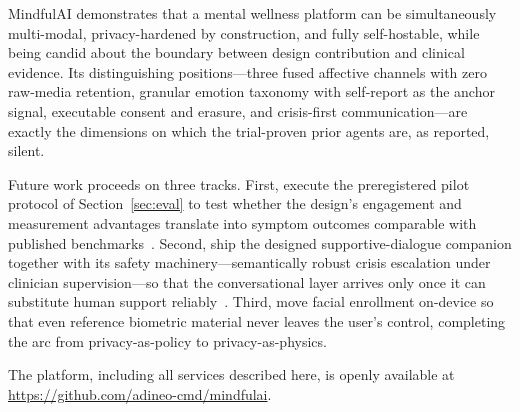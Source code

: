 \documentclass[11pt,a4paper]{article}
\newcommand{\system}{MindfulAI}
\begin{document}
\system{} demonstrates that a mental wellness platform can be simultaneously multi-modal, privacy-hardened by construction, and fully self-hostable, while being candid about the boundary between design contribution and clinical evidence. Its distinguishing positions---three fused affective channels with zero raw-media retention, granular emotion taxonomy with self-report as the anchor signal, executable consent and erasure, and crisis-first communication---are exactly the dimensions on which the trial-proven prior agents are, as reported, silent.

Future work proceeds on three tracks. First, execute the preregistered pilot protocol of Section~\ref{sec:eval} to test whether the design's engagement and measurement advantages translate into symptom outcomes comparable with published benchmarks~\cite{linardon2019,fitzpatrick2017}. Second, ship the designed supportive-dialogue companion together with its safety machinery---semantically robust crisis escalation under clinician supervision---so that the conversational layer arrives only once it can substitute human support reliably~\cite{abdalrazaq2020}. Third, move facial enrollment on-device so that even reference biometric material never leaves the user's control, completing the arc from privacy-as-policy to privacy-as-physics.

The platform, including all services described here, is openly available at \url{https://github.com/adineo-cmd/mindfulai}.


\end{document}
